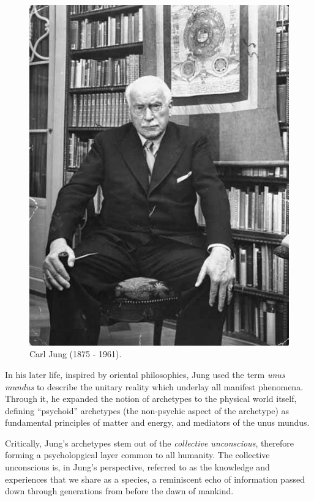 \documentclass[
]{book}
\begin{document}
\begin{figure}

{\centering \includegraphics[width=\textwidth]{img/jung} 

}

\caption{Carl Jung (1875 - 1961).}\label{fig:unnamed-chunk-6}
\end{figure}

In his later life, inspired by oriental philosophies, Jung used the term \emph{unus mundus} to describe the unitary reality which underlay all manifest phenomena. Through it, he expanded the notion of archetypes to the physical world itself, defining ``psychoid'' archetypes (the non-psychic aspect of the archetype) as fundamental principles of matter and energy, and mediators of the unus mundus.

Critically, Jung's archetypes stem out of the \emph{collective unconscious}, therefore forming a psycholopgical layer common to all humanity. The collective unconscious is, in Jung's perspective, referred to as the knowledge and experiences that we share as a species, a reminiscent echo of information passed down through generations from before the dawn of mankind.
\end{document}
